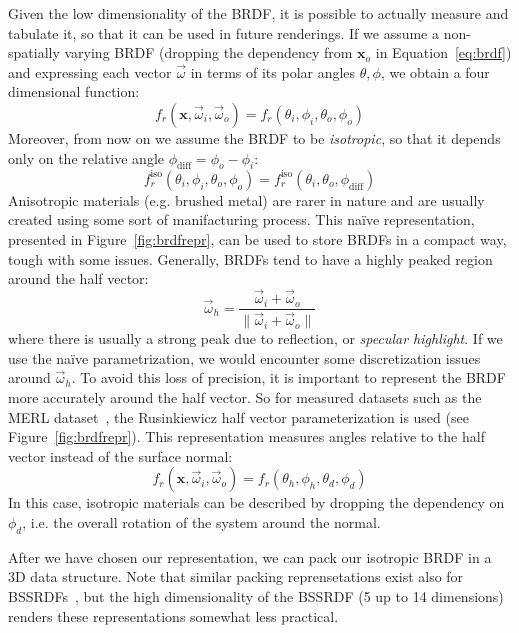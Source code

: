 Given the low dimensionality of the BRDF, it is possible to actually measure and tabulate it, so that it can be used in future renderings. If we assume a non-spatially varying BRDF (dropping the dependency from $\mathbf{x}_o$ in Equation~\ref{eq:brdf}) and expressing each vector $\vec{\omega}$ in terms of its polar angles $\theta, \phi$, we obtain a four dimensional function:
\begin{equation*}
f_r(\mathbf{x}, \vec{\omega}_i,  \vec{\omega}_o) = f_r(\theta_i, \phi_i, \theta_o, \phi_o)
\end{equation*}
Moreover, from now on we assume the BRDF to be \emph{isotropic}, so that it depends only on the relative angle $\phi_\text{diff} = \phi_o - \phi_i$:
\begin{equation*}
f_r^\text{iso}(\theta_i, \phi_i, \theta_o, \phi_o) = f_r^\text{iso}(\theta_i, \theta_o, \phi_\text{diff})
\end{equation*}
Anisotropic materials (e.g. brushed metal) are rarer in nature and are usually created using some sort of manifacturing process.
This na\"ive representation, presented in Figure~\ref{fig:brdfrepr}, can be used to store BRDFs in a compact way, tough with some issues. Generally, BRDFs tend to have a highly peaked region around the half vector:
\begin{equation*}\vec{\omega}_h = \frac{\vec{\omega}_i + \vec{\omega}_o}{\|\vec{\omega}_i + \vec{\omega}_o\|}
\end{equation*}
where there is usually a strong peak due to reflection, or \emph{specular highlight}. If we use the na\"ive parametrization, we would encounter some discretization issues around $\vec{\omega}_h$. To avoid this loss of precision, it is important to represent the BRDF more accurately around the half vector. So for measured datasets such as the MERL dataset~\cite{Matusik2003}, the Rusinkiewicz half vector parameterization is used (see Figure~\ref{fig:brdfrepr}). This representation measures angles relative to the half vector instead of the surface normal:
\begin{equation*}
f_r(\mathbf{x}, \vec{\omega}_i,  \vec{\omega}_o) = f_r(\theta_h, \phi_h, \theta_d, \phi_d)
\end{equation*}
In this case,  isotropic materials can be described by dropping the dependency on $\phi_d$, i.e. the overall rotation of the system around the normal.

After we have chosen our representation, we can pack our isotropic BRDF in a 3D data structure. Note that similar packing reprensetations exist also for BSSRDFs~\cite{Donner2009}, but the high dimensionality of the BSSRDF (5 up to 14 dimensions) renders these representations somewhat less practical.

